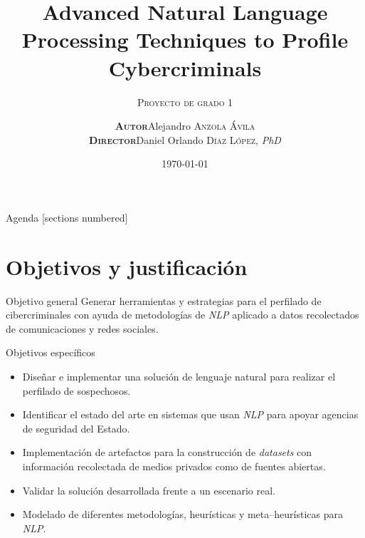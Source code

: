 \documentclass[10pt]{beamer}
\title{Advanced Natural Language Processing Techniques to Profile Cybercriminals}
\subtitle{\textsc{Proyecto de grado 1}}
\date{\today}
\institute{Escuela Colombiana de Ingenier\'{\i}a Julio Garavito}
\begin{document}
\author{%
  \begin{tabular}{rl}
    \textsc{\scriptsize \textbf{Autor}}    & Alejandro \textsc{Anzola \'Avila} \\
    \textsc{\scriptsize \textbf{Director}} & Daniel Orlando \textsc{D\'{\i}az L\'opez}, \textit{PhD} \\
  \end{tabular}
  \vspace{1em}
}


\maketitle

\begin{frame}{Agenda}
  [sections numbered]
  \tableofcontents
\end{frame}

\section{Objetivos y justificación}

\begin{frame}{Objetivo general}
  Generar herramientas y estrategias para el perfilado de cibercriminales con ayuda de metodologías de \emph{NLP} aplicado a datos recolectados de comunicaciones y redes sociales.
\end{frame}

\begin{frame}{Objetivos específicos}
  \begin{itemize}
  \item Diseñar e implementar una solución de lenguaje natural para realizar el perfilado de sospechosos.

  \item Identificar el estado del arte en sistemas que usan \emph{NLP} para apoyar agencias de seguridad del Estado.
    
  \item Implementación de artefactos para la construcción de \emph{datasets} con información recolectada de medios privados como de fuentes abiertas.
    
  \item Validar la solución desarrollada frente a un escenario real.

  \item Modelado de diferentes metodologías, heurísticas y meta--heurísticas para \emph{NLP}.
  \end{itemize}
  
\end{frame}
\end{document}
